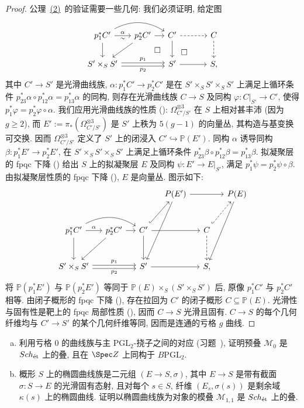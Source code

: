 \begin{proof}
公理~\hyperlink{stack-axiom-2}{(2)}~的验证需要一些几何: 我们必须证明, 给定图
\[
\begin{tikzcd}[column sep=small]
p_1^*C'\arrow[r,"\alpha", "\sim"']\arrow[d]\arrow[rr,bend left=30]&
p_2^*C'\arrow[dl]\arrow[r]\arrow[dr,phantom,"\square"]&C'\arrow[rr,dashed]\arrow[d]\arrow[dr,phantom,"\square"]&{}&C\arrow[d,dashed]\\
S'\times_S S'\arrow[rr,shift left=2pt,"p_1"]\arrow[rr,shift right=2pt,"p_2"']&{}&S'\arrow[rr]&{}&S,
\end{tikzcd}
\]
其中 $C'\to S'$ 是光滑曲线族, $\alpha:p_1^*C'\to p_2^*C'$ 是在 $S'\times_S S'\times_S S'$ 上满足上循环条件 $p_{23}^*\alpha\circ p_{12}^*\alpha=p_{13}^*\alpha$ 的同构, 则存在光滑曲线族 $C\to S$ 及同构 $\varphi:C|_{S'}\to C'$, 使得 $p_1^*\varphi=p_2^*\varphi\circ\alpha$.
我们应用光滑曲线族的性质 (): $\Omega_{C'/S'}^{\otimes3}$ 在 $S$ 上相对甚丰沛 (因为 $g\geq2$), 而 $E':=\pi_*(\Omega_{C'/S'}^{\otimes3})$ 是 $S'$ 上秩为 $5(g-1)$ 的向量丛, 其构造与基变换可交换. 因而 $\Omega_{C'/S'}^{\otimes3}$ 定义了 $S'$ 上的闭浸入 $C'\hookrightarrow\mathbb P(E')$.
同构 $\alpha$ 诱导同构 $\beta:p_1^*E'\to p_2^*E'$, 在 $S'\times_S S'\times_S S'$ 上满足上循环条件 $p_{23}^*\beta\circ p_{12}^*\beta=p_{13}^*\beta$.
拟凝聚层的 fpqc 下降 () 给出 $S$ 上的拟凝聚层 $E$ 及同构 $\psi:E'\to E|_{S'}$, 满足 $p_1^*\psi=p_2^*\psi\circ\beta$.
由拟凝聚层性质的 fpqc 下降 (), $E$ 是向量丛. 图示如下:
\[
\begin{tikzcd}[column sep=small,row sep=large]
{}&{}&{}&\mathbb P(E')\arrow[rr]\arrow[ddl]&{}&\mathbb P(E)\arrow[ddl]\\
p_1^*C'\arrow[r,"\alpha"]\arrow[d]\arrow[rr,bend left=30]&
p_2^*C'\arrow[dl]\arrow[r]&
C'\arrow[rr]\arrow[d]\arrow[ur,hook]&{}&C\arrow[d,dashed]\arrow[ur,dashed,hook]&{}\\
S'\times_S S'\arrow[rr,shift left=2pt,"p_1"]\arrow[rr,shift right=2pt,"p_2"']&{}&S'\arrow[rr]&{}&S,&{}
\end{tikzcd}
\]
将 $\mathbb P(p_1^*E')$ 与 $\mathbb P(p_2^*E')$ 等同于 $\mathbb P(E)\times_S(S'\times_S S')$ 后, 原像 $p_1^*C'$ 与 $p_2^*C'$ 相等. 由闭子概形的 fpqc 下降 (), 存在拉回为 $C'$ 的闭子概形 $C\subseteq\mathbb P(E)$. 光滑性与固有性是靶上的 fpqc 局部性质 (), 因而 $C\to S$ 光滑且固有. $C\to S$ 的每个几何纤维均与 $C'\to S'$ 的某个几何纤维等同, 因而是连通的亏格 $g$ 曲线.
\end{proof}
\begin{exercise}\label{src:3.5.15}
\begin{enumerate}[(a)]
\item 利用亏格 $0$ 的曲线族与主 $\mathrm{PGL}_2$-挠子之间的对应 (习题~), 证明预叠 $\mathcal M_0$ 是 $Sch_{\text{ét}}$ 上的叠, 且在 $\Spec\mathbb Z$ 上同构于 $B\mathrm{PGL}_2$.
\item 概形 $S$ 上的椭圆曲线族是二元组 $(E\to S,\sigma)$, 其中 $E\to S$ 是带有截面 $\sigma:S\to E$ 的光滑固有态射, 且对每个 $s\in S$, 纤维 $(E_s,\sigma(s))$ 是剩余域 $\kappa(s)$ 上的椭圆曲线. 证明以椭圆曲线族为对象的模叠 $\mathcal M_{1,1}$ 是 $Sch_{\text{ét}}$ 上的叠.
\end{enumerate}
\end{exercise}
